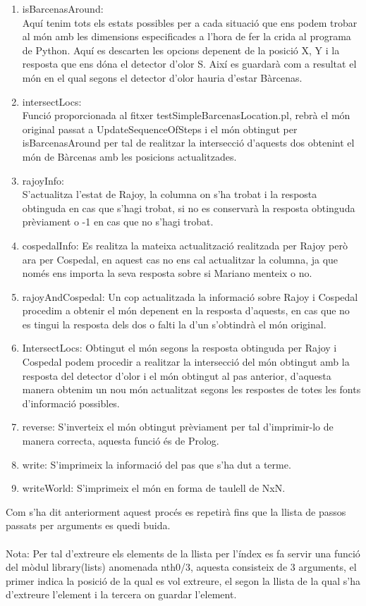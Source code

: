 \documentclass[11pt]{article}
\begin{document}
\begin{enumerate}
\item isBarcenasAround:\\
Aquí tenim tots els estats possibles per a cada situació que ens podem trobar al món amb les dimensions especificades a l'hora de fer la crida al programa de Python. Aquí es descarten les opcions depenent de la posició X, Y i la resposta que ens dóna el detector d'olor S. Així es guardarà com a resultat el món en el qual segons el detector d'olor hauria d'estar Bàrcenas.
\item intersectLocs:\\
Funció proporcionada al fitxer testSimpleBarcenasLocation.pl, rebrà el món original passat a UpdateSequenceOfSteps i el món obtingut per isBarcenasAround per tal de realitzar la intersecció d'aquests dos obtenint el món de Bàrcenas amb les posicions actualitzades.
\item rajoyInfo:\\
S'actualitza l'estat de Rajoy, la columna on s'ha trobat i la resposta obtinguda en cas que s'hagi trobat, si no es conservarà la resposta obtinguda prèviament o -1 en cas que no s'hagi trobat.
\item cospedalInfo:
Es realitza la mateixa actualització realitzada per Rajoy però ara per Cospedal, en aquest cas no ens cal actualitzar la columna, ja que només ens importa la seva resposta sobre si Mariano menteix o no.
\item rajoyAndCospedal:
Un cop actualitzada la informació sobre Rajoy i Cospedal procedim a obtenir el món depenent en la resposta d'aquests, en cas que no es tingui la resposta dels dos o falti la d'un s'obtindrà el món original.
\newpage
\item IntersectLocs:
Obtingut el món segons la resposta obtinguda per Rajoy i Cospedal podem procedir a realitzar la intersecció del món obtingut amb la resposta del detector d'olor i el món obtingut al pas anterior, d'aquesta manera obtenim un nou món actualitzat segons les respostes de totes les fonts d'informació possibles.
\item reverse:
S'inverteix el món obtingut prèviament per tal d'imprimir-lo de manera correcta, aquesta funció és de Prolog.
\item write:
S'imprimeix la informació del pas que s'ha dut a terme.
\item writeWorld:
S'imprimeix el món en forma de taulell de NxN.
\end{enumerate}
Com s'ha dit anteriorment aquest procés es repetirà fins que la llista de passos passats per arguments es quedi buida.\\\\
Nota: Per tal d'extreure els elements de la llista per l'índex es fa servir una funció del mòdul library(lists) anomenada nth0/3, aquesta consisteix de 3 arguments, el primer indica la posició de la qual es vol extreure, el segon la llista de la qual s'ha d'extreure l'element i la tercera on guardar l'element.
\end{document}
